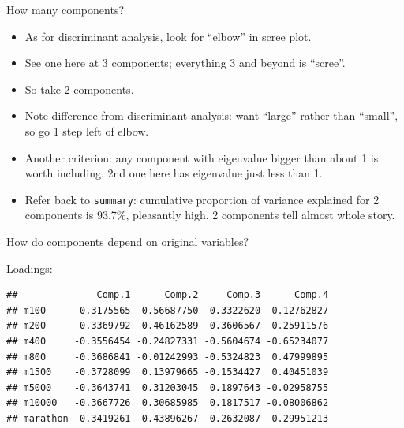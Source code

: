 \begin{frame}[fragile]{How many components?}
  
  \begin{itemize}
  \item As for discriminant analysis, look for ``elbow'' in scree plot.
  \item See one here at 3 components; everything 3 and beyond is ``scree''.
  \item So take 2 components.
  \item Note difference from discriminant analysis: want ``large''
    rather than ``small'', so go 1 step left of elbow.
  \item Another criterion: any component with eigenvalue bigger than
    about 1 is worth including. 2nd one here has eigenvalue just less
    than 1.
  \item Refer back to \texttt{summary}: cumulative proportion of
    variance explained for 2 components is 93.7\%, pleasantly high. 2
    components tell almost whole story.
  \end{itemize}
  
\end{frame}

\begin{frame}[fragile]{How do components depend on original variables?}
  
  Loadings:

\begin{knitrout}
\color{fgcolor}\begin{kframe}
\begin{alltt}
\hlopt{$}\hlstd{loadings[,}\hlopt{:}\hlstd{]}
\end{alltt}
\begin{verbatim}
##              Comp.1      Comp.2     Comp.3      Comp.4
## m100     -0.3175565 -0.56687750  0.3322620 -0.12762827
## m200     -0.3369792 -0.46162589  0.3606567  0.25911576
## m400     -0.3556454 -0.24827331 -0.5604674 -0.65234077
## m800     -0.3686841 -0.01242993 -0.5324823  0.47999895
## m1500    -0.3728099  0.13979665 -0.1534427  0.40451039
## m5000    -0.3643741  0.31203045  0.1897643 -0.02958755
## m10000   -0.3667726  0.30685985  0.1817517 -0.08006862
## marathon -0.3419261  0.43896267  0.2632087 -0.29951213
\end{verbatim}
\end{kframe}
\end{knitrout}

  
\end{frame}

